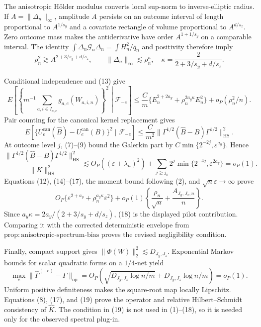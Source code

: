 The anisotropic H\"older modulus converts local sup-norm to inverse-elliptic radius. If \(A=\|\Delta_n\|_\infty\), amplitude \(A\) persists on an outcome interval of length proportional to \(A^{1/s_y}\) and a covariate rectangle of volume proportional to \(A^{d/s_z}\). Zero outcome mass makes the antiderivative have order \(A^{1+1/s_y}\) on a comparable interval. The identity \(\int\Delta_n\mathcal G_n\Delta_n=\int H_n^2/\bar q_n\) and positivity therefore imply
\[
\rho_n^2\gtrsim A^{2+3/s_y+d/s_z},
\qquad
\|\Delta_n\|_\infty\lesssim\rho_n^\kappa,
\quad \kappa=\frac{2}{2+3/s_y+d/s_z}.                            \tag{14}
\]

Conditional independence and (13) give
\[
E\!\left[\left\{m^{-1}\sum_{a,i\in I_{a,e}}g_{a,e}(W_{a,i,n})\right\}^2\middle|\mathscr F_{-e}\right]
\le\frac C m\{E_n^{2+2a_y}+\rho_n^{2a_y\kappa}E_n^2\}+o_P(\rho_n^2/n). \tag{15}
\]
Pair counting for the canonical kernel replacement gives
\[
E[\{U_e^{\mathrm{can}}(\widehat B)-U_e^{\mathrm{can}}(B)\}^2\mid\mathscr F_{-e}]
\le\frac C{m^2}\|\Gamma^{1/2}(\widehat B-B)\Gamma^{1/2}\|_{\mathrm{HS}}^2. \tag{16}
\]
At outcome level \(j\), (7)--(9) bound the Galerkin part by \(C\min\{2^{-2j},\varepsilon^{a_y}\}\). Hence
\[
\frac{\|\Gamma^{1/2}(\widehat B-B)\Gamma^{1/2}\|_{\mathrm{HS}}^2}{\|K\|_{\mathrm{HS}}^2}
\lesssim O_P((\varepsilon+\lambda_n)^2)
+\sum_{j\ge j_0}2^j\min\{2^{-4j},\varepsilon^{2a_y}\}=o_P(1).  \tag{17}
\]
Equations (12), (14)--(17), the moment bound following (2), and \(\sqrt n\varepsilon\to\infty\) prove
\[
O_P\{\varepsilon^{2+a_y}+\rho_n^{a_y\kappa}\varepsilon^2\}
+o_P(1)\left\{\frac{\rho_n}{\sqrt n}+\frac{A_{J_y,J_z,n}}n\right\}. \tag{18}
\]
Since \(a_y\kappa=2a_y/(2+3/s_y+d/s_z)\), (18) is the displayed pilot contribution. Comparing it with the corrected deterministic envelope from \(\mathrm{prop{:}anisotropic\text{-}spectrum\text{-}bias}\) proves the revised negligibility condition.

Finally, compact support gives \(\|\Phi(W)\|_2^2\lesssim D_{J_y,J_z}\). Exponential Markov bounds for scalar quadratic forms on a \(1/4\)-net yield
\[
\max_e\|\widehat\Gamma^{(-e)}-\Gamma\|_{\mathrm{op}}
=O_P\!\left(\sqrt{D_{J_y,J_z}\log n/m}+D_{J_y,J_z}\log n/m\right)=o_P(1). \tag{19}
\]
Uniform positive definiteness makes the square-root map locally Lipschitz. Equations (8), (17), and (19) prove the operator and relative Hilbert--Schmidt consistency of \(\widehat K\). The condition in (19) is not used in (1)--(18), so it is needed only for the observed spectral plug-in.